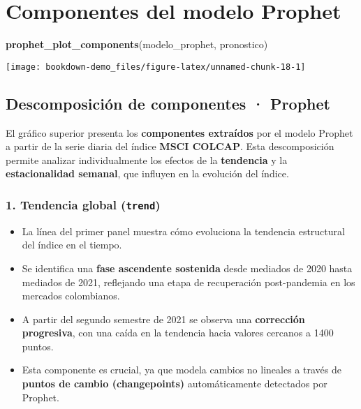 \documentclass[
  11pt,
]{book}
\newenvironment{Shaded}{\begin{snugshade}}{\end{snugshade}}
\newcommand{\FunctionTok}[1]{\textcolor[rgb]{0.13,0.29,0.53}{\textbf{#1}}}
\newcommand{\NormalTok}[1]{#1}
\providecommand{\tightlist}{%
  \setlength{\itemsep}{0pt}\setlength{\parskip}{0pt}}
\begin{document}
\section{Componentes del modelo Prophet}\label{componentes-del-modelo-prophet}

\begin{Shaded}
\begin{Highlighting}[]
\FunctionTok{prophet\_plot\_components}\NormalTok{(modelo\_prophet, pronostico)}
\end{Highlighting}
\end{Shaded}

\begin{center}\texttt{[image: bookdown-demo\_files/figure-latex/unnamed-chunk-18-1]} \end{center}

\subsection{Descomposición de componentes · Prophet}\label{descomposiciuxf3n-de-componentes-prophet}

El gráfico superior presenta los \textbf{componentes extraídos} por el modelo Prophet a partir de la serie diaria del índice \textbf{MSCI COLCAP}. Esta descomposición permite analizar individualmente los efectos de la \textbf{tendencia} y la \textbf{estacionalidad semanal}, que influyen en la evolución del índice.

\subsubsection{\texorpdfstring{1. Tendencia global (\texttt{trend})}{1. Tendencia global (trend)}}\label{tendencia-global-trend}

\begin{itemize}
\tightlist
\item
  La línea del primer panel muestra cómo evoluciona la tendencia estructural del índice en el tiempo.
\item
  Se identifica una \textbf{fase ascendente sostenida} desde mediados de 2020 hasta mediados de 2021, reflejando una etapa de recuperación post-pandemia en los mercados colombianos.
\item
  A partir del segundo semestre de 2021 se observa una \textbf{corrección progresiva}, con una caída en la tendencia hacia valores cercanos a 1400 puntos.
\item
  Esta componente es crucial, ya que modela cambios no lineales a través de \textbf{puntos de cambio (changepoints)} automáticamente detectados por Prophet.
\end{itemize}
\end{document}
